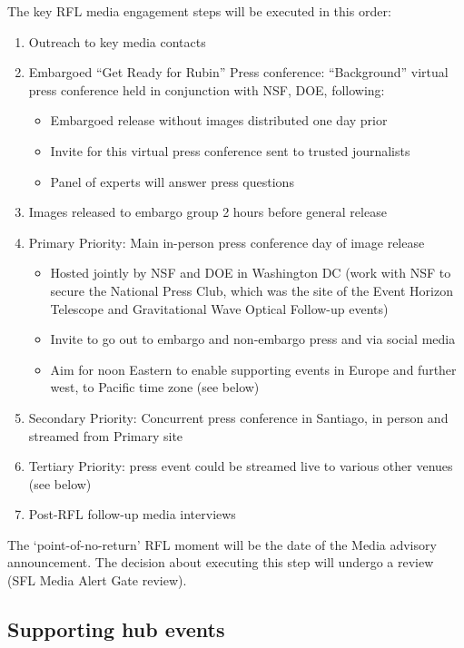 The key RFL media engagement steps will be executed in this order:  
\begin{enumerate}
\item Outreach to key media contacts
\item Embargoed “Get Ready for Rubin” Press conference: ``Background'' virtual press conference held in
conjunction with NSF, DOE, following: 
  \begin{itemize} 
    \item Embargoed release without images distributed one day prior
    \item Invite for this virtual press conference sent to trusted journalists
    \item Panel of experts will answer press questions
  \end{itemize}
\item Images released to embargo group 2 hours before general release
\item Primary Priority: Main in-person press conference day of image release
  \begin{itemize}
  \item  Hosted jointly by NSF and DOE in Washington DC (work with NSF to secure the National Press Club,
        which was the site of the Event Horizon Telescope and Gravitational Wave Optical Follow-up events)
  \item Invite to go out to embargo and non-embargo press and via social media
  \item Aim for noon Eastern to enable supporting events in Europe and further west, to Pacific time zone (see below) 
  \end{itemize}
\item Secondary Priority: Concurrent press conference in Santiago, in person and streamed from Primary site 
\item Tertiary Priority: press event could be streamed live to various other venues (see below)
\item Post-RFL follow-up media interviews
\end{enumerate} 

The ‘point-of-no-return’ RFL moment will be the date of the Media advisory announcement.
The decision about executing this step will undergo a review (SFL Media Alert Gate review).
 


\subsection{Supporting hub events}

